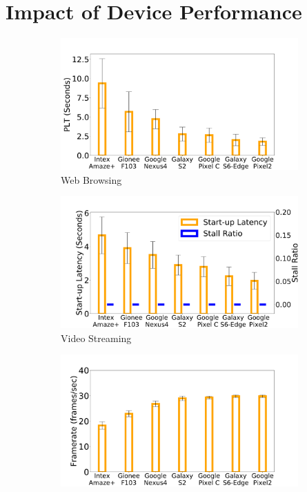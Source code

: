 

\section{Impact of Device Performance} \label{intro}

\begin{figure}[t]
    \begin{subfigure}[b]{0.33\textwidth}
        \centering
        \includegraphics[width=1\linewidth]{sections/device-work/plt-devices}
        \caption{Web Browsing}
    \end{subfigure}
    \begin{subfigure}[b]{0.33\textwidth}
        \centering
        \includegraphics[width=1\linewidth]{sections/device-work/youtube-motivation}
        \caption{Video Streaming}
    \end{subfigure}%
    \begin{subfigure}[b]{0.33\textwidth}
        \centering
        \includegraphics[width=1\linewidth]{sections/device-work/skype-motivation}

\end{subfigure}
\end{figure}
